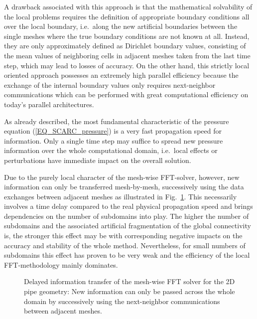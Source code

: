 A drawback associated with this approach is that the mathematical solvability of the local problems requires the definition of appropriate boundary conditions all over the local boundary, i.e.\ along the new artificial boundaries between the single meshes where the true boundary conditions are not known at all. Instead, they are only approximately defined as Dirichlet boundary values, consisting of the mean values of neighboring cells in adjacent meshes taken from the last time step, which may lead to losses of accuracy.
%
On the other hand, this strictly local oriented approach possesses an extremely high parallel efficiency because the exchange of the internal boundary values only requires next-neighbor communications which can be performed with great computational efficiency on today's parallel architectures.

As already described, the most fundamental characteristic of the pressure equation (\ref{EQ_SCARC_pressure})  is a very fast propagation speed for information. Only a single time step may suffice to spread new pressure information over the whole computational domain, i.e.\ local effects or perturbations have immediate impact on the overall solution. 

Due to the purely local character of the mesh-wise FFT-solver, however, new information can only be transferred mesh-by-mesh, successively using the data exchanges between adjacent meshes  as illustrated in Fig.~\ref{FIG_SCARC_mesh_wise_transfer}.
%
This necessarily involves a time delay compared to the real physical propagation speed and brings dependencies on the number of subdomains into play.
The higher the number of subdomains and the associated artificial fragmentation of the global connectivity is, the stronger this effect may be with corresponding negative impacts on the accuracy and stability of the whole method.
Nevertheless, for small numbers of subdomains this effect has proven to be very weak and the efficiency of the local FFT-methodology mainly dominates.

\begin{center}
\begin{figure}[ht]
\begin{minipage}{4.3cm}

\end{minipage}
\begin{minipage}{3.9cm}

\end{minipage}
\begin{minipage}{3.9cm}

\end{minipage}
\begin{minipage}{3.9cm}

\end{minipage}
\caption[Delayed information transfer of the mesh-wise FFT solver]{Delayed information transfer of the mesh-wise FFT solver for the 2D pipe geometry: New information can only be passed across the whole domain by successively using the next-neighbor communications between adjacent meshes.}
\label{FIG_SCARC_mesh_wise_transfer}
\end{figure}
\end{center}



